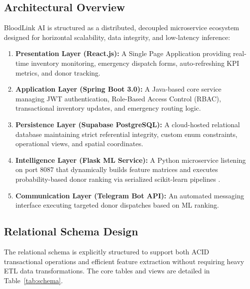 \documentclass[conference]{IEEEtran}
\begin{document}
\subsection{Architectural Overview}
BloodLink AI is structured as a distributed, decoupled microservice ecosystem designed for horizontal scalability, data integrity, and low-latency inference:
\begin{enumerate}
    \item \textbf{Presentation Layer (React.js):} A Single Page Application providing real-time inventory monitoring, emergency dispatch forms, auto-refreshing KPI metrics, and donor tracking.
    \item \textbf{Application Layer (Spring Boot 3.0):} A Java-based core service managing JWT authentication, Role-Based Access Control (RBAC), transactional inventory updates, and emergency routing logic.
    \item \textbf{Persistence Layer (Supabase PostgreSQL):} A cloud-hosted relational database maintaining strict referential integrity, custom enum constraints, operational views, and spatial coordinates.
    \item \textbf{Intelligence Layer (Flask ML Service):} A Python microservice listening on port 8087 that dynamically builds feature matrices and executes probability-based donor ranking via serialized scikit-learn pipelines \cite{pedregosa2011sklearn}.
    \item \textbf{Communication Layer (Telegram Bot API):} An automated messaging interface executing targeted donor dispatches based on ML ranking.
\end{enumerate}

\subsection{Relational Schema Design}
The relational schema is explicitly structured to support both ACID transactional operations and efficient feature extraction without requiring heavy ETL data transformations. The core tables and views are detailed in Table~\ref{tab:schema}.
\end{document}
